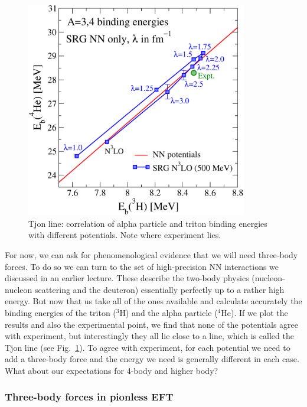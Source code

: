   \begin{figure}[tbh]
  \begin{center}
    \includegraphics[width=3.8in]{figures/tjon_line_srg2}
    \caption{Tjon line: correlation of alpha particle and triton binding energies
    with different potentials.  Note where experiment lies.}
    \label{fig:tjon_line}
  \end{center}
  \end{figure}


For now, we can ask for phenomenological evidence that we will need three-body
forces.  To do so we can turn to the set of high-precision NN interactions
we discussed in an earlier lecture.  These describe the two-body physics
(nucleon-nucleon scattering and the deuteron) essentially perfectly up to
a rather high energy.  But now that us take all of the ones available and
calculate accurately the binding energies of the triton ($^3$H) and the alpha
particle ($^4$He).  If we plot the results and also the experimental point,
we find that none of the potentials agree with experiment, but interestingly 
they all lie close to a line, which is called the Tjon line
(see Fig.~\ref{fig:tjon_line}).  
To agree with experiment, for each potential we need to add a three-body
force and the energy we need is generally different in each case.
What about our expectations for 4-body and higher body?


 
\subsubsection{Three-body forces in pionless EFT}


